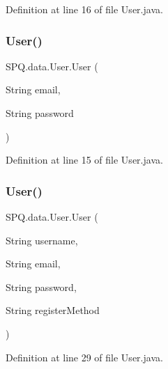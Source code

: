 Definition at line 16 of file User.\+java.

\mbox{\label{class_s_p_q_1_1data_1_1_user_acc8d4cd3f95c3da8a14117c6057a3e8b}} 
\subsubsection{\texorpdfstring{User()}{User()}\hspace{0.1cm}{\footnotesize\ttfamily [2/5]}}
{\footnotesize\ttfamily S\+P\+Q.\+data.\+User.\+User (\begin{DoxyParamCaption}\item[{String}]{email,  }\item[{String}]{password }\end{DoxyParamCaption})}



Definition at line 15 of file User.\+java.

\mbox{\label{class_s_p_q_1_1data_1_1_user_a7e0244e513a080fbe8e77cbd07b74e53}} 
\subsubsection{\texorpdfstring{User()}{User()}\hspace{0.1cm}{\footnotesize\ttfamily [3/5]}}
{\footnotesize\ttfamily S\+P\+Q.\+data.\+User.\+User (\begin{DoxyParamCaption}\item[{String}]{username,  }\item[{String}]{email,  }\item[{String}]{password,  }\item[{String}]{register\+Method }\end{DoxyParamCaption})}



Definition at line 29 of file User.\+java.

\mbox{\label{class_s_p_q_1_1data_1_1_user_af8e381901a649027950a0b0f8b22a235}} 
